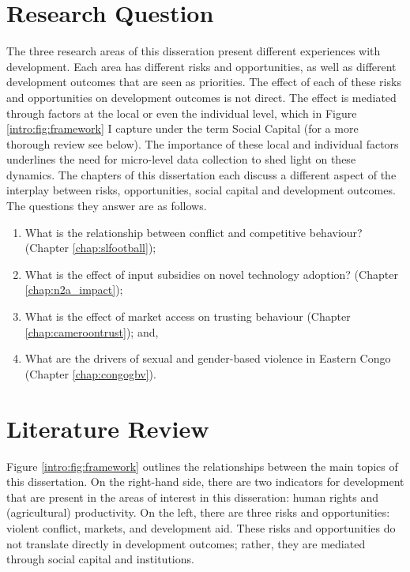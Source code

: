 \section{Research Question}
The three research areas of this disseration present different experiences with development. Each area has different risks and opportunities, as well as different development outcomes that are seen as priorities. The effect of each of these risks and opportunities on development outcomes is not direct. The effect is mediated through factors at the local or even the individual level, which in Figure \ref{intro:fig:framework} I capture under the term Social Capital (for a more thorough review see below). The importance of these local and individual factors underlines the need for micro-level data collection to shed light on these dynamics. The chapters of this dissertation each discuss a different aspect of the interplay between risks, opportunities, social capital and development outcomes. The questions they answer are as follows.
\begin{enumerate}
	\item What is the relationship between conflict and competitive behaviour? (Chapter \ref{chap:slfootball});
	\item What is the effect of input subsidies on novel technology adoption? (Chapter \ref{chap:n2a_impact});
	\item What is the effect of market access on trusting behaviour (Chapter \ref{chap:cameroontrust}); and,
	\item What are the drivers of sexual and gender-based violence in Eastern Congo (Chapter \ref{chap:congogbv}).
\end{enumerate}


\section{Literature Review}
Figure \ref{intro:fig:framework} outlines the relationships between the main topics of this dissertation. On the right-hand side, there are two indicators for development that are present in the areas of interest in this disseration: human rights and (agricultural) productivity. On the left, there are three risks and opportunities: violent conflict, markets, and development aid. These risks and opportunities do not translate directly in development outcomes; rather, they are mediated through social capital and institutions.

